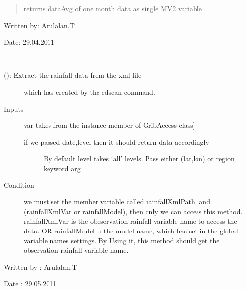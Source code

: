 \documentclass[letterpaper,10pt,english]{sphinxmanual}
\begin{document}
\begin{fulllineitems}
\begin{fulllineitems}
\begin{quote}
\begin{description}
returns dataAvg of one month data as single MV2 variable

\end{description}
\end{quote}

Written by: Arulalan.T

Date: 29.04.2011

\end{fulllineitems}


\begin{fulllineitems}
\label{diagnosisutils:xml_data_access.GribXmlAccess.getRainfallData}~\begin{description}
\item[{{\hyperref[diagnosisutils:xml_data_access.GribXmlAccess.getRainfallData]{}} (): Extract the rainfall data from the xml file}] \leavevmode
which has created by the cdscan command.

\item[{Inputs}] \leavevmode{[}var takes from the instance member of GribAccess class{]}\begin{description}
\item[{if we passed date,level then it should return data accordingly}] \leavevmode
By default level takes `all' levels.
Pass either (lat,lon) or region keyword arg

\end{description}

\item[{Condition}] \leavevmode{[}we must set the member variable called rainfallXmlPath{]}
and (rainfallXmlVar or rainfallModel), then only we can
access this method. rainfallXmlVar is the obeservation
rainfall variable name to access the data. OR
rainfallModel is the model name, which has set in the
global variable names settings. By Using it, this method
should get the observation rainfall variable name.

\end{description}

Written by : Arulalan.T

Date : 29.05.2011

\end{fulllineitems}


\end{fulllineitems}
\end{document}

